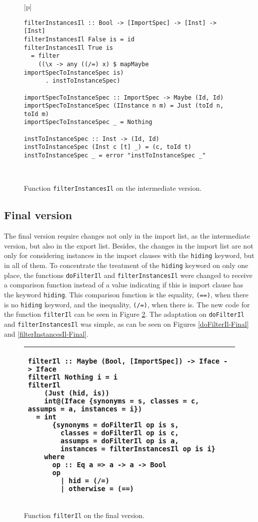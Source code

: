 \documentclass[msc]{ppgccufmg}
\begin{document}
\begin{figure}
\caption{Function \texttt{filterInstancesIl} on the intermediate version.\label{filterInstancesIl-Intermediate}}
\begin{tabular}{|p{\textwidth}|}
\hline
\begin{verbatim}
filterInstancesIl :: Bool -> [ImportSpec] -> [Inst] -> [Inst]
filterInstancesIl False is = id
filterInstancesIl True is
  = filter
    ((\x -> any ((/=) x) $ mapMaybe importSpecToInstanceSpec is)
      . instToInstanceSpec)

importSpecToInstanceSpec :: ImportSpec -> Maybe (Id, Id)
importSpecToInstanceSpec (IInstance n m) = Just (toId n, toId m)
importSpecToInstanceSpec _ = Nothing

instToInstanceSpec :: Inst -> (Id, Id)
instToInstanceSpec (Inst c [t] _) = (c, toId t)
instToInstanceSpec _ = error "instToInstanceSpec _"
\end{verbatim}
\\
\hline
\end{tabular}
\end{figure}

\subsection{Final version}
The final version require changes not only in the import list, as the intermediate version, but also in the export list.
Besides, the changes in the import list are not only for considering instances in the import clauses with the \texttt{hiding} keyword, but in all of them.
To concentrate the treatment of the \texttt{hiding} keyword on only one place, the functions \texttt{doFilterIl} and \texttt{filterInstancesIl} were changed to receive a comparison function instead of a value indicating if this is import clause has the keyword \texttt{hiding}.
This comparison function is the equality, \texttt{(==)}, when there is no \texttt{hiding} keyword, and the inequality, \texttt{(/=)}, when there is.
The new code for the function \texttt{filterIl} can be seen in Figure \ref{filterIl-Final}.
The adaptation on \texttt{doFilterIl} and \texttt{filterInstancesIl} was simple, as can be seen on Figures \ref{doFilterIl-Final} and \ref{filterInstancesIl-Final}.

\begin{figure}
\caption{Function \texttt{filterIl} on the final version.\label{filterIl-Final}}
\begin{tabular}{|p{\textwidth}|}
\hline
\begin{verbatim}
filterIl :: Maybe (Bool, [ImportSpec]) -> Iface -> Iface
filterIl Nothing i = i
filterIl
    (Just (hid, is))
    int@(Iface {synonyms = s, classes = c, assumps = a, instances = i})
  = int
      {synonyms = doFilterIl op is s,
        classes = doFilterIl op is c,
        assumps = doFilterIl op is a,
        instances = filterInstancesIl op is i}
    where
      op :: Eq a => a -> a -> Bool
      op
        | hid = (/=)
        | otherwise = (==)
\end{verbatim}
\\
\hline
\end{tabular}
\end{figure}
\end{document}

